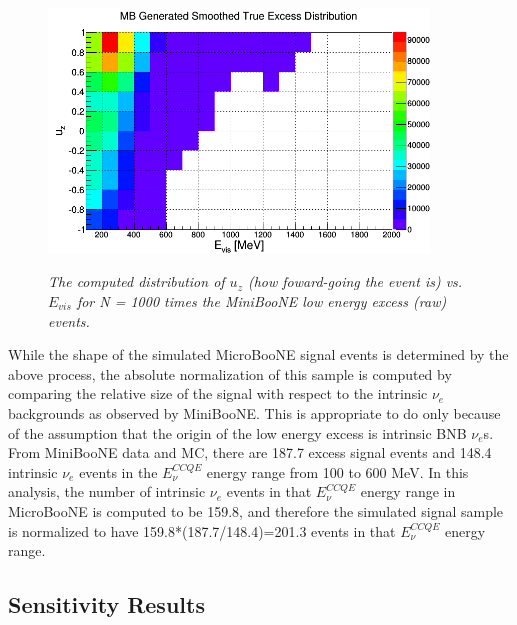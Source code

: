 \begin{figure}[ht!]
\centering
	\includegraphics[width=0.9\textwidth]{Figures/miniboone_excess_th2d.png} \\
\caption{\textit{The computed distribution of $u_z$ (how foward-going the event is) vs. $E_{vis}$ for N = 1000 times the MiniBooNE low energy excess (raw) events.}}\label{MBth2dfig}
\end{figure}

While the shape of the simulated MicroBooNE signal events is determined by the above process, the absolute normalization of this sample is computed by comparing the relative size of the signal with respect to the intrinsic $\nu_e$ backgrounds as observed by MiniBooNE. This is appropriate to do only because of the assumption that the origin of the low energy excess is intrinsic BNB $\nu_e$s. From MiniBooNE data and MC, there are 187.7 excess signal events and 148.4 intrinsic $\nu_e$ events in the $E_\nu^{CCQE}$ energy range from 100 to 600 MeV. In this analysis, the number of intrinsic $\nu_e$ events in that $E_\nu^{CCQE}$ energy range in MicroBooNE is computed to be 159.8, and therefore the simulated signal sample is normalized to have 159.8*(187.7/148.4)=201.3 events in that $E_\nu^{CCQE}$ energy range.\\





















\subsection{Sensitivity Results}

